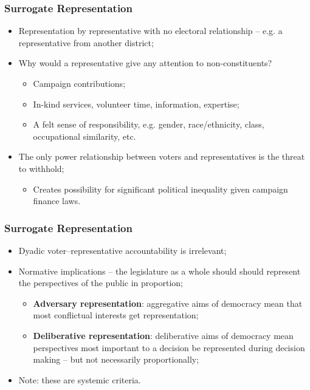 \documentclass[aspectratio=169]{beamer}
\theoremstyle{principle}
\begin{document}
\begin{frame}
\frametitle{Surrogate Representation}
\begin{itemize}
\item Representation by representative with no electoral relationship -- e.g. a representative from another district;
\bigskip
\bigskip
\item Why would a representative give any attention to non-constituents?
\begin{itemize}
\item Campaign contributions;
\item In-kind services, volunteer time, information, expertise;
\item A felt sense of responsibility, e.g. gender, race/ethnicity, class, occupational similarity, etc.
\end{itemize}
\bigskip
\bigskip
\item The only power relationship between voters and representatives is the threat to withhold;
\begin{itemize}
\item Creates possibility for significant political inequality given campaign finance laws.
\end{itemize}
\end{itemize}

\end{frame}

\begin{frame}
\frametitle{Surrogate Representation}
\begin{itemize}
\item Dyadic voter--representative accountability is irrelevant;
\bigskip
\bigskip
\item Normative implications -- the legislature as a whole should should represent the perspectives of the public in proportion;
\begin{itemize}
\item \textbf{Adversary representation}: aggregative aims of democracy mean that most conflictual interests get representation;
\item \textbf{Deliberative representation}: deliberative aims of democracy mean perspectives most important to a decision be represented during decision making -- but not necessarily proportionally;
\end{itemize}
\bigskip
\bigskip
\item Note: these are systemic criteria.
\end{itemize}

\end{frame}
\end{document}

